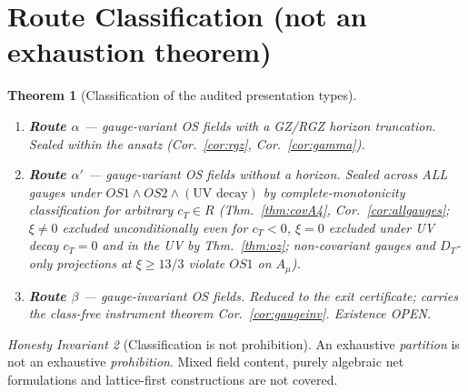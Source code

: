 \documentclass[11pt,a4paper]{article}
\def\R{R}\def\N{N}\def\Q{Q}\def\Z{Z}\def\Class{C}\def\OS{OS}\def\Gap{Gap}%
\theoremstyle{plain}
\newtheorem{theorem}{Theorem}[section]
\theoremstyle{definition}
\theoremstyle{remark}
\newtheorem{invariant}[theorem]{Honesty Invariant}
\newcommand{\R}{\mathbb{R}}\newcommand{\N}{\mathbb{N}}\newcommand{\Q}{\mathbb{Q}}
\newcommand{\Z}{\mathbb{Z}}\newcommand{\Spec}{\operatorname{Spec}}
\newcommand{\OS}{\mathrm{OS}}\newcommand{\Gap}{\mathrm{Gap}}
\newcommand{\Class}{\mathcal{C}}\newcommand{\Htot}{\mathcal{H}}
\renewcommand{\_}{\oldunderscore\allowbreak}
\begin{document}
\section{Route Classification (not an exhaustion theorem)}\label{sec:routes}
\begin{theorem}[Classification of the audited presentation types]\label{thm:routes}
\begin{enumerate}[label=(\alph*),leftmargin=22pt,itemsep=1pt]
\item \textbf{Route $\alpha$} --- gauge-variant OS fields with a GZ/RGZ horizon truncation.
\emph{Sealed within the ansatz} (Cor.~\ref{cor:rgz}, Cor.~\ref{cor:gamma}).
\item \textbf{Route $\alpha'$} --- gauge-variant OS fields without a horizon. \emph{Sealed across ALL gauges under $\OS1\wedge\OS2\wedge(\text{UV decay})$} by complete-monotonicity classification for arbitrary $c_T\in\R$ (Thm.~\ref{thm:covA4}, Cor.~\ref{cor:allgauges}; $\xi\neq0$ excluded unconditionally even for $c_T<0$, $\xi=0$ excluded under UV decay $c_T=0$ and in the UV by Thm.~\ref{thm:oz}; non-covariant gauges and $D_T$-only projections at $\xi\ge13/3$ violate $\OS1$ on $A_\mu$).
\item \textbf{Route $\beta$} --- gauge-invariant OS fields. \emph{Reduced} to the exit
certificate; carries the class-free instrument theorem Cor.~\ref{cor:gaugeinv}. Existence
\emph{OPEN}.
\end{enumerate}
\end{theorem}
\begin{invariant}[Classification is not prohibition]\label{inv:routes}
An exhaustive \emph{partition} is not an exhaustive \emph{prohibition}. Mixed field content,
purely algebraic net formulations and lattice-first constructions are not covered.
\end{invariant}
\end{document}
